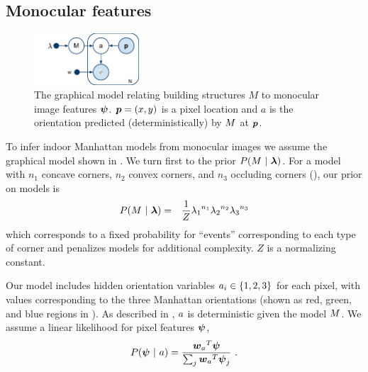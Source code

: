 \subsection{Monocular features}

\begin{figure}[tb]
  \centering
  \includegraphics[width=0.35\textwidth]{figures/monocular-gm}
  \caption{The graphical model relating building structures $M$ to
    monocular image features $\boldsymbol{\psi}$. $\boldsymbol{p}=(x,y)$ is a
    pixel location and $a$ is the orientation predicted (deterministically) by
    $M$ at $\boldsymbol{p}$.}
  \label{fig:monocular-gm}
\end{figure}

To infer indoor Manhattan models from monocular images we assume the
graphical model shown in . We turn first to the
prior $P(M~|~\boldsymbol{\lambda})$. For a model with $n_1$ concave
corners, $n_2$ convex corners, and $n_3$ occluding corners
(\cf {}), our prior on models is
\begin{eqnarray}
  \label{eq:model-prior}
  P(M ~|~ \boldsymbol{\lambda}) &=& \frac{1}{Z} 
    {\lambda_1}^{n_1} {\lambda_2}^{n_2} {\lambda_3}^{n_3}
\end{eqnarray}
which corresponds to a fixed probability for ``events'' corresponding
to each type of corner and penalizes models for additional
complexity. $Z$ is a normalizing constant.

Our model includes hidden orientation variables
$a_i\in\{1,2,3\}$ for each pixel, with values corresponding to
the three Manhattan orientations (shown as red, green, and blue
regions in ). As described in ,
$a$ is deterministic given the model $M$. We assume a
linear likelihood for pixel features $\boldsymbol{\psi}$,
\begin{equation}
\label{eq:feature-likelihood}
  P(\boldsymbol{\psi} ~|~ a) = \frac{{\boldsymbol{w}_a}^T\boldsymbol{\psi}}
  {\sum_j{\boldsymbol{w}_a}^T\boldsymbol{\psi}_j} ~.
\end{equation}

